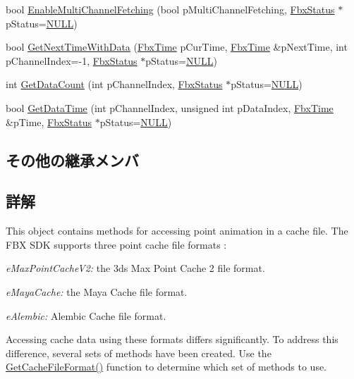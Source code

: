\begin{DoxyCompactItemize}
\item 
bool \hyperlink{class_fbx_cache_a7dadad5c92261dc4a87638385b49b921}{Enable\+Multi\+Channel\+Fetching} (bool p\+Multi\+Channel\+Fetching, \hyperlink{class_fbx_status}{Fbx\+Status} $\ast$p\+Status=\hyperlink{fbxarch_8h_a070d2ce7b6bb7e5c05602aa8c308d0c4}{N\+U\+LL})
\item 
bool \hyperlink{class_fbx_cache_ae79158c3d2966623035e6cb27f5f17fe}{Get\+Next\+Time\+With\+Data} (\hyperlink{class_fbx_time}{Fbx\+Time} p\+Cur\+Time, \hyperlink{class_fbx_time}{Fbx\+Time} \&p\+Next\+Time, int p\+Channel\+Index=-\/1, \hyperlink{class_fbx_status}{Fbx\+Status} $\ast$p\+Status=\hyperlink{fbxarch_8h_a070d2ce7b6bb7e5c05602aa8c308d0c4}{N\+U\+LL})
\item 
int \hyperlink{class_fbx_cache_a983233fa5f9e457651e3bc0f6dfde219}{Get\+Data\+Count} (int p\+Channel\+Index, \hyperlink{class_fbx_status}{Fbx\+Status} $\ast$p\+Status=\hyperlink{fbxarch_8h_a070d2ce7b6bb7e5c05602aa8c308d0c4}{N\+U\+LL})
\item 
bool \hyperlink{class_fbx_cache_a75e249b339bf5a2b1d4f713ee6697e2a}{Get\+Data\+Time} (int p\+Channel\+Index, unsigned int p\+Data\+Index, \hyperlink{class_fbx_time}{Fbx\+Time} \&p\+Time, \hyperlink{class_fbx_status}{Fbx\+Status} $\ast$p\+Status=\hyperlink{fbxarch_8h_a070d2ce7b6bb7e5c05602aa8c308d0c4}{N\+U\+LL})
\end{DoxyCompactItemize}
\subsection*{その他の継承メンバ}


\subsection{詳解}
This object contains methods for accessing point animation in a cache file. The F\+BX S\+DK supports three point cache file formats \+:
\begin{DoxyItemize}
\item {\itshape e\+Max\+Point\+Cache\+V2\+:} the 3ds Max Point Cache 2 file format.
\item {\itshape e\+Maya\+Cache\+:} the Maya Cache file format.
\item {\itshape e\+Alembic\+:} Alembic Cache file format.
\end{DoxyItemize}

Accessing cache data using these formats differs significantly. To address this difference, several sets of methods have been created. Use the \hyperlink{class_fbx_cache_adabf432059b20e05cda5f3ddfab8f767}{Get\+Cache\+File\+Format()} function to determine which set of methods to use. 

